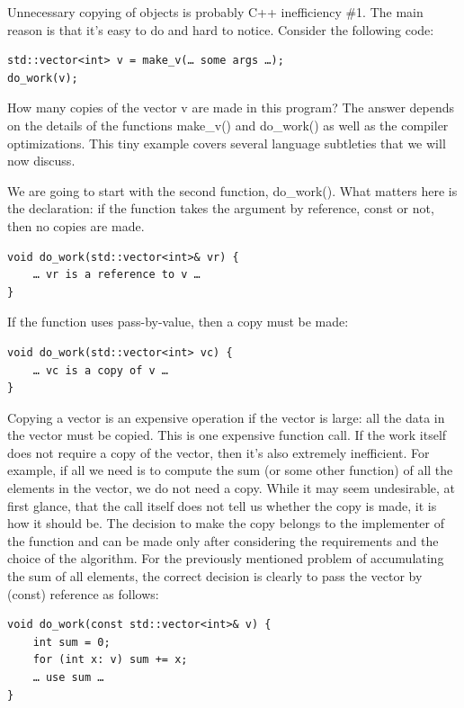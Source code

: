 Unnecessary copying of objects is probably C++ inefficiency \#1. The main reason is that it’s easy to do and hard to notice. Consider the following code:

\begin{lstlisting}[style=styleCXX]
std::vector<int> v = make_v(… some args …);
do_work(v);
\end{lstlisting}

How many copies of the vector v are made in this program? The answer depends on the details of the functions make\_v() and do\_work() as well as the compiler optimizations. This tiny example covers several language subtleties that we will now discuss.


We are going to start with the second function, do\_work(). What matters here is the declaration: if the function takes the argument by reference, const or not, then no copies are made.

\begin{lstlisting}[style=styleCXX]
void do_work(std::vector<int>& vr) {
	… vr is a reference to v …
}
\end{lstlisting}

If the function uses pass-by-value, then a copy must be made:

\begin{lstlisting}[style=styleCXX]
void do_work(std::vector<int> vc) {
	… vc is a copy of v …
}
\end{lstlisting}

Copying a vector is an expensive operation if the vector is large: all the data in the vector must be copied. This is one expensive function call. If the work itself does not require a copy of the vector, then it’s also extremely inefficient. For example, if all we need is to compute the sum (or some other function) of all the elements in the vector, we do not need a copy. While it may seem undesirable, at first glance, that the call itself does not tell us whether the copy is made, it is how it should be. The decision to make the copy belongs to the implementer of the function and can be made only after considering the requirements and the choice of the algorithm. For the previously mentioned problem of accumulating the sum of all elements, the correct decision is clearly to pass the vector by (const) reference as follows:

\begin{lstlisting}[style=styleCXX]
void do_work(const std::vector<int>& v) {
	int sum = 0;
	for (int x: v) sum += x;
	… use sum … 
}
\end{lstlisting}


